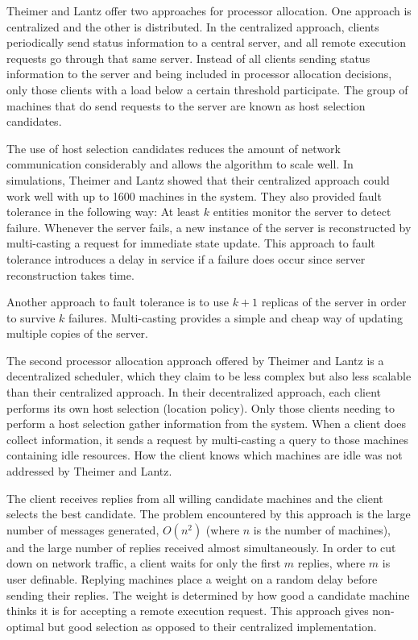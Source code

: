 \documentclass{report}
\begin{document}
Theimer and Lantz offer two approaches for processor allocation.  One
approach is centralized and the other is distributed.  In the centralized
approach, clients periodically send status information to a central server,
and all remote execution requests go through that same server.  Instead of
all clients sending status information to the server and being included in
processor allocation decisions, only those clients with a load below a
certain threshold participate.  The group of machines that do send requests
to the server are known as host selection candidates.

The use of host selection candidates reduces the amount of network
communication considerably and allows the algorithm to scale well.  In
simulations, Theimer and Lantz showed that their centralized approach could
work well with up to 1600 machines in the system.  They also provided fault
tolerance in the following way:  At least $k$ entities monitor the
server to detect failure.  Whenever the server fails, a new instance of the
server is reconstructed by multi-casting a request for immediate state
update.  This approach to fault tolerance introduces a delay in service if a
failure does occur since server reconstruction takes time.

Another approach to fault tolerance is to use $k + 1$ replicas of the server
in order to survive $k$ failures.  Multi-casting provides a simple and cheap
way of updating multiple copies of the server.  

The second processor allocation approach offered by Theimer and Lantz is a
decentralized scheduler, which they claim to be less complex but also less
scalable than their centralized approach.  In their decentralized approach,
each client performs its own host selection (location policy).  Only those
clients needing to perform a host selection gather information from the
system.  When a client does collect information, it sends a request by
multi-casting a query to those machines containing idle resources.  How the
client knows which machines are idle was not addressed by Theimer and
Lantz.  

The client receives replies from all willing candidate machines and the
client selects the best candidate.  The problem encountered by this approach
is the large number of messages generated, $O(n^2)$ (where $n$ is the number
of machines), and the large number of replies received almost
simultaneously.  In order to cut down on network traffic, a client waits for
only the first $m$ replies, where $m$ is user definable.  Replying machines
place a weight on a random delay before sending their replies.  The weight
is determined by how good a candidate machine thinks it is for accepting a
remote execution request.  This approach gives non-optimal but good
selection as opposed to their centralized implementation.
\end{document}
